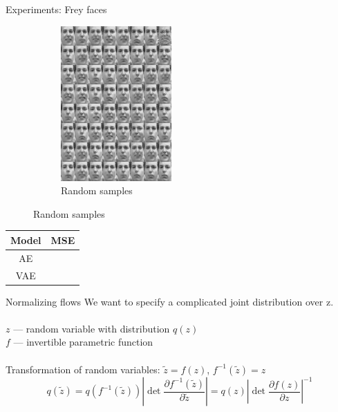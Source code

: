 \documentclass[unicode,11pt]{beamer}
\begin{document}
\begin{frame}{Experiments: Frey faces}
\begin{figure}
\begin{subfigure}[b]{.4\linewidth}
      \includegraphics[width=.8\linewidth]{images/vae_frey_B100_E4000_N560_L2_H200_C_sample_64}
      \caption{Random samples}
    \end{subfigure}
  \end{figure}

  \centering
  \begin{tabular}{cc}
    \textbf{Model} & \textbf{MSE} \\
    \hline
    AE  & \\
    VAE &
  \end{tabular}
\end{frame}


\begin{frame}
  \centering\fontsize{24pt}{1em}\color{darkred}{\selectfont{What is wrong with VAE?}}
\end{frame}


\begin{frame}[fragile]{Normalizing flows}
  We want to specify a complicated joint distribution over z.\\
  ~\\
  $z$ --- random variable with distribution $q(z)$\\  
  $f$ --- invertible parametric function\\
  ~\\
  Transformation of random variables: $\tilde{z} = f(z)$, $f^{-1}(\tilde{z}) = z$\\
  $$
  q(\tilde{z})
  = q(f^{-1}(\tilde{z})) \left\vert \det \frac{\partial f^{-1}(\tilde{z})}{\partial \tilde{z}} \right\vert
  = q(z) \left\vert \det \frac{\partial f(z)}{\partial z} \right\vert^{-1}
  $$ \\

\end{frame}
\end{document}
